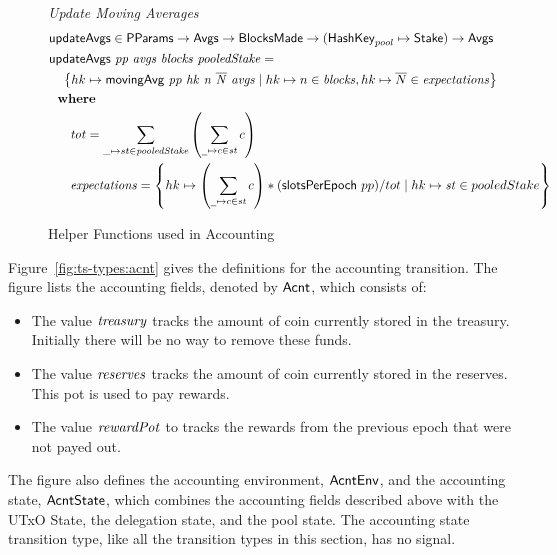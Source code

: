 \begin{figure}[htb]
  \emph{Update Moving Averages}
  \begin{align*}
      & \fun{updateAvgs} \in \PParams \to \Avgs \to \BlocksMade \to
          (\HashKey_{pool}\mapsto \Stake) \to \Avgs \\
      & \updateAvgs{pp}{avgs}{blocks}{pooledStake} = \\
      & ~~~ \left\{hk\mapsto \movingAvg{pp}{hk}{n}{\overline{N}}{avgs}
            \mid
            hk\mapsto n\in\var{blocks}, hk\mapsto\overline{N}\in\var{expectations}
            \right\} \\
      & \where \\
      & ~~~~~ \var{tot} = \sum_{\_\mapsto st\in \var{pooledStake}}
                          \left(\sum_{\wcard\mapsto c\in\var{st}}c\right) \\
      & ~~~~~ \var{expectations} =
                \left\{
                  hk\mapsto\left(\sum_{
                    \wcard\mapsto c\in\var{st}}c\right)*(\fun{slotsPerEpoch}~{pp}) / tot
                  \mid
                  hk\mapsto\var{st} \in pooledStake
                \right\}
  \end{align*}
  \caption{Helper Functions used in Accounting}
  \label{fig:funcs:acnt}
\end{figure}



Figure~\ref{fig:ts-types:acnt} gives the definitions for the accounting transition.
The figure lists the accounting fields, denoted by $\mathsf{Acnt}$, which consists of:
\begin{itemize}
  \item The value $\mathit{treasury}$ tracks the amount of coin currently stored in the treasury.
    Initially there will be no way to remove these funds.
  \item The value $\mathit{reserves}$ tracks the amount of coin currently stored in the reserves.
    This pot is used to pay rewards.
  \item The value $\mathit{rewardPot}$ to tracks the rewards from the previous epoch that were not
    payed out.
\end{itemize}
The figure also defines the accounting environment, $\mathsf{AcntEnv}$, and the accounting state,
$\mathsf{AcntState}$, which combines the accounting fields described above with the UTxO State,
the delegation state, and the pool state.
The accounting state transition type, like all the transition types in this section, has no signal.

